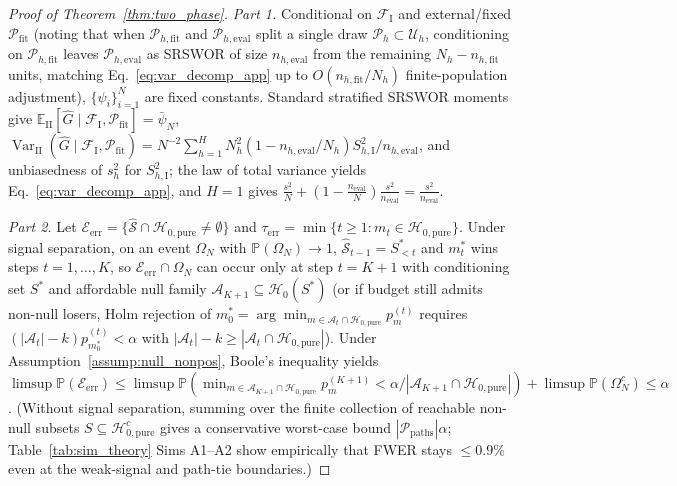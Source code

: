 \documentclass[11pt]{article}
\theoremstyle{remark}
\begin{document}
\begin{proof}[Proof of Theorem~\ref{thm:two_phase}]
\emph{Part 1.} Conditional on $\mathcal{F}_{\text{I}}$ and external/fixed $\mathcal{P}_{\text{fit}}$ (noting that when $\mathcal{P}_{h,\text{fit}}$ and $\mathcal{P}_{h,\text{eval}}$ split a single draw $\mathcal{P}_h \subset \mathcal{U}_h$, conditioning on $\mathcal{P}_{h,\text{fit}}$ leaves $\mathcal{P}_{h,\text{eval}}$ as SRSWOR of size $n_{h,\text{eval}}$ from the remaining $N_h - n_{h,\text{fit}}$ units, matching Eq.~\eqref{eq:var_decomp_app} up to $O(n_{h,\text{fit}}/N_h)$ finite-population adjustment), $\{\psi_i\}_{i=1}^N$ are fixed constants. Standard stratified SRSWOR moments \citep{horvitz1952generalization,lumley2010complex} give $\mathbb{E}_{\text{II}}[\hat{G} \mid \mathcal{F}_{\text{I}}, \mathcal{P}_{\text{fit}}] = \bar{\psi}_N$, $\operatorname{Var}_{\text{II}}(\hat{G} \mid \mathcal{F}_{\text{I}}, \mathcal{P}_{\text{fit}}) = N^{-2}\sum_{h=1}^H N_h^2 (1 - n_{h,\text{eval}}/N_h) S_{h,\text{I}}^2 / n_{h,\text{eval}}$, and unbiasedness of $s_h^2$ for $S_{h,\text{I}}^2$; the law of total variance yields Eq.~\eqref{eq:var_decomp_app}, and $H=1$ gives $\frac{s^2}{N} + (1 - \frac{n_{\text{eval}}}{N})\frac{s^2}{n_{\text{eval}}} = \frac{s^2}{n_{\text{eval}}}$.

\emph{Part 2.} Let $\mathcal{E}_{\text{err}} = \{\widehat{\mathcal{S}} \cap \mathcal{H}_{0,\text{pure}} \ne \emptyset\}$ and $\tau_{\text{err}} = \min\{t \ge 1 : m_t \in \mathcal{H}_{0,\text{pure}}\}$. Under signal separation, on an event $\Omega_N$ with $\mathbb{P}(\Omega_N) \to 1$, $\widehat{\mathcal{S}}_{t-1} = S_{<t}^*$ and $m_t^*$ wins steps $t = 1, \dots, K$, so $\mathcal{E}_{\text{err}} \cap \Omega_N$ can occur only at step $t = K + 1$ with conditioning set $S^*$ and affordable null family $\mathcal{A}_{K+1} \subseteq \mathcal{H}_0(S^*)$ (or if budget still admits non-null losers, Holm rejection of $m_0^* = \arg\min_{m \in \mathcal{A}_t \cap \mathcal{H}_{0,\text{pure}}} p_m^{(t)}$ requires $(|\mathcal{A}_t| - k) p_{m_0^*}^{(t)} < \alpha$ with $|\mathcal{A}_t| - k \ge |\mathcal{A}_t \cap \mathcal{H}_{0,\text{pure}}|$). Under Assumption~\ref{assump:null_nonpos}, Boole's inequality yields $\limsup \mathbb{P}(\mathcal{E}_{\text{err}}) \le \limsup \mathbb{P}(\min_{m \in \mathcal{A}_{K+1}\cap \mathcal{H}_{0,\text{pure}}} p_m^{(K+1)} < \alpha / |\mathcal{A}_{K+1}\cap \mathcal{H}_{0,\text{pure}}|) + \limsup \mathbb{P}(\Omega_N^c) \le \alpha$. (Without signal separation, summing over the finite collection of reachable non-null subsets $S \subseteq \mathcal{H}_{0,\text{pure}}^c$ gives a conservative worst-case bound $|\mathcal{P}_{\text{paths}}|\alpha$; Table~\ref{tab:sim_theory} Sims A1--A2 show empirically that FWER stays $\le 0.9\%$ even at the weak-signal and path-tie boundaries.)
\end{proof}
\end{document}
